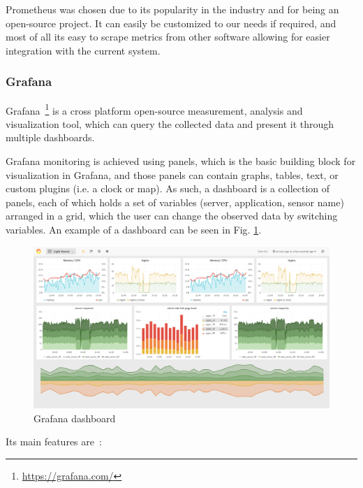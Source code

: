 Prometheus was chosen due to its popularity in the industry and for being an open-source project. It can easily be customized to our needs if required, and most of all its easy to scrape metrics from other software allowing for easier integration with the current system.


\subsubsection{Grafana}
\label{sss:grafana}

Grafana~\footnote{\url{https://grafana.com/}} is a cross platform open-source measurement, analysis and visualization tool, which can query the collected data and present it through multiple dashboards. 

Grafana monitoring is achieved using panels, which is the basic building block for visualization in Grafana, and those panels can contain graphs, tables, text, or custom plugins (i.e. a clock or map). As such, a dashboard is a collection of panels, each of which holds a set of variables (server, application, sensor name) arranged in a grid, which the user can change the observed data by switching variables. An example of a dashboard can be seen in Fig. \ref{fig:grafana-example}.

\begin{figure}[h]
    \centering
    \includegraphics[width=1\textwidth,clip,trim=0 0 0 0]{Chapters/img/2_background/grafana-example.png}
    \caption{Grafana dashboard~\cite{grafana-example}} 
    \label{fig:grafana-example}
\end{figure}

Its main features are~\cite{grafana-features}:

